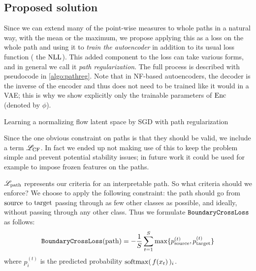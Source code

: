 \documentclass[../main.tex]{subfiles}
\begin{document}
\subsection{Proposed solution}

Since we can extend many of the point-wise measures to whole paths in a natural way, \eg{} with the mean or the maximum, we propose applying this as a loss on the whole path and using it to \emph{train the autoencoder} in addition to its usual loss function (\eg{} the $\text{NLL}$).
This added component to the loss can take various forms, and in general we call it \emph{path regularization}.
The full process is described with pseudocode in \autoref{algo:pathreg}.
Note that in NF-based autoencoders, the decoder is the inverse of the encoder and thus does not need to be trained like it would in a VAE; this is why we show explicitly only the trainable parameters of $\operatorname{Enc}$ (denoted by $\phi$).

\begin{algorithm}
\caption{Learning a normalizing flow latent space by SGD with path regularization}
\label{algo:pathreg}
\end{algorithm}

Since the one obvious constraint on paths is that they should be valid, we include a term $\mathscr{L}_\text{CF}$.
In fact we ended up not making use of this to keep the problem simple and prevent potential stability issues;
in future work it could be used for example to impose frozen features on the paths.

$\mathscr{L}_\text{path}$ represents our criteria for an interpretable path. So what criteria should we enforce?
We choose to apply the following constraint: the path should go from $\mathrm{source}$ to $\mathrm{target}$ passing through as few other classes as possible, and ideally, without passing through any other class.
Thus we formulate $\mathtt{BoundaryCrossLoss}$ as follows:
\begin{align*}
\mathtt{BoundaryCrossLoss}(\mathrm{path}) = -
\frac{1}{S} \sum_{t=1}^{S}
\max \{ p^{(t)}_{\mathrm{source}}, p^{(t)}_{\mathrm{target}} \}
\end{align*}
where $p^{(t)}_i$ is the predicted probability $\mathrm{softmax}(\,f(x_t)\,)_i$.
\end{document}
